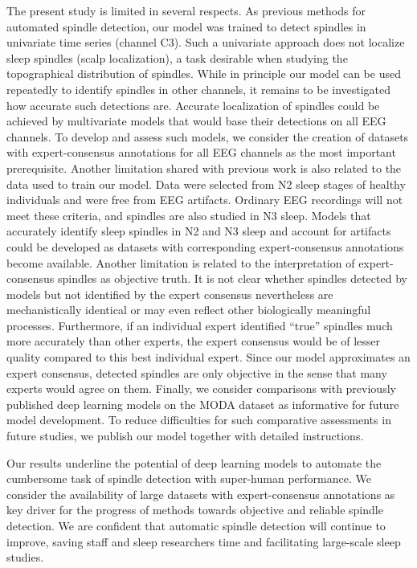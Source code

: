 \documentclass[fleqn,twocolumn,10pt]{wlscirep}
\begin{document}
The present study is limited in several respects.
As previous methods for automated spindle detection, our model was trained to
detect spindles in univariate time series (channel C3).
Such a univariate approach does not localize sleep spindles (scalp
localization\cite{CoppieterstWallant2016}), a task desirable when studying the
topographical distribution of spindles.
While in principle our model can be used repeatedly to identify spindles in
other channels, it remains to be investigated how accurate such detections are.
Accurate localization of spindles could be achieved by multivariate models that
would base their detections on all EEG channels.
To develop and assess such models, we consider the creation of datasets with
expert-consensus annotations for all EEG channels as the most important
prerequisite.
Another limitation shared with previous work\cite{Lacourse2019,Tapia2020} is
also related to the data used to train our model.
Data were selected from N2 sleep stages of healthy individuals and were free
from EEG artifacts.
Ordinary EEG recordings will not meet these criteria, and spindles are also
studied in N3 sleep.
Models that accurately identify sleep spindles in N2 and N3 sleep and account
for artifacts could be developed as datasets with corresponding expert-consensus
annotations become available.
Another limitation is related to the interpretation
of expert-consensus spindles as objective truth.
It is not clear whether spindles detected by models but not identified by the
expert consensus nevertheless are mechanistically identical or may even reflect
other biologically meaningful processes\cite{Lacourse2020}.
Furthermore, if an individual expert identified ``true'' spindles much more
accurately than other experts, the expert consensus would be of lesser quality
compared to this best individual expert.
Since our model approximates an expert consensus, detected spindles are only
objective in the sense that many experts would agree on them.
Finally, we consider comparisons with previously published deep learning models
on the MODA dataset as informative for future model development.
To reduce difficulties for such comparative assessments in future studies, we
publish our model together with detailed instructions\cite{Kaulen2022a}.

Our results underline the potential of deep learning models to automate the
cumbersome task of spindle detection with super-human performance.
We consider the availability of large datasets with expert-consensus annotations
as key driver for the progress of methods towards objective and reliable spindle
detection.
We are confident that automatic spindle detection will continue to improve,
saving staff and sleep researchers time and facilitating large-scale sleep
studies.
 
\end{document}
